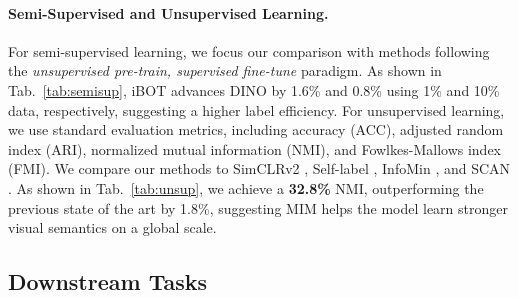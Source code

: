 \documentclass{article} %
\def\ourmethod{{iBOT}\xspace}
\begin{document}
\paragraph{Semi-Supervised and Unsupervised Learning.} 
For semi-supervised learning, we focus our comparison with methods 
following the \textit{unsupervised pre-train, supervised fine-tune} paradigm.
As shown in Tab.~\ref{tab:semisup}, \ourmethod advances DINO by 1.6\% and 0.8\% using 1\% and 10\% data, respectively, suggesting a higher label efficiency.
For unsupervised learning, we use standard evaluation metrics, including accuracy (ACC), adjusted random index (ARI), normalized mutual information (NMI), and Fowlkes-Mallows index (FMI). 
We compare our methods to SimCLRv2 \citep{simclrv2}, Self-label \citep{self-label}, InfoMin \citep{infomin}, and SCAN \citep{scan}.
As shown in Tab.~\ref{tab:unsup}, we achieve a \textbf{32.8\%} NMI, outperforming the previous state of the art by 1.8\%, suggesting MIM helps the model learn stronger visual semantics on a global scale.

\subsection{Downstream Tasks}
\label{sec:downstream}

\end{document}
